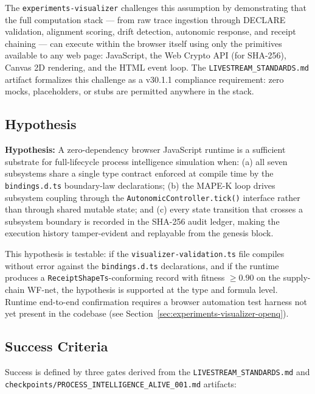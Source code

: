 The \texttt{experiments-visualizer} challenges this assumption by demonstrating that the full
computation stack — from raw trace ingestion through DECLARE validation, alignment scoring,
drift detection, autonomic response, and receipt chaining — can execute within the browser
itself using only the primitives available to any web page: JavaScript, the Web Crypto API
(for SHA-256), Canvas 2D rendering, and the HTML event loop. The \texttt{LIVESTREAM\_STANDARDS.md}
artifact formalizes this challenge as a v30.1.1 compliance requirement: zero mocks,
placeholders, or stubs are permitted anywhere in the stack.

\subsection{Hypothesis}
\label{sec:experiments-visualizer-rq-hypothesis}

\textbf{Hypothesis:} A zero-dependency browser JavaScript runtime is a sufficient substrate for
full-lifecycle process intelligence simulation when: (a) all seven subsystems share a single
type contract enforced at compile time by the \texttt{bindings.d.ts} boundary-law declarations;
(b) the MAPE-K loop drives subsystem coupling through the \texttt{AutonomicController.tick()}
interface rather than through shared mutable state; and (c) every state transition that crosses
a subsystem boundary is recorded in the SHA-256 audit ledger, making the execution history
tamper-evident and replayable from the genesis block.

This hypothesis is testable: if the \texttt{visualizer-validation.ts} file compiles without
error against the \texttt{bindings.d.ts} declarations, and if the runtime produces a
\texttt{ReceiptShapeTs}-conforming record with fitness $\geq 0.90$ on the supply-chain WF-net,
the hypothesis is supported at the type and formula level. Runtime end-to-end confirmation
requires a browser automation test harness not yet present in the codebase (see Section~\ref{sec:experiments-visualizer-openq}).

\subsection{Success Criteria}
\label{sec:experiments-visualizer-rq-criteria}

Success is defined by three gates derived from the \texttt{LIVESTREAM\_STANDARDS.md} and
\texttt{checkpoints/PROCESS\_INTELLIGENCE\_ALIVE\_001.md} artifacts:

